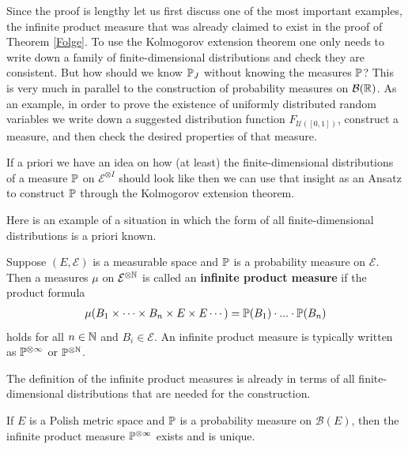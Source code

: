 Since the proof is lengthy let us first discuss one of the most important examples, the infinite product measure that was already claimed to exist in the proof of Theorem \ref{Folge}. To use the Kolmogorov extension theorem one only needs to write down a family of finite-dimensional distributions and check they are consistent. But how should we know $\P_J$ without knowing the measures $\P$? This is very much in parallel to the construction of probability measures on $\mathcal B(\R)$. As an example, in order to prove the existence of uniformly distributed random variables we write down a suggested distribution function $F_{\mathcal U([0,1])}$, construct a measure, and then check the desired properties of that measure.
\begin{laufmerksamkeit}
	If a priori we have an idea on how (at least) the finite-dimensional distributions of a measure $\P$ on $\mathcal E^{\otimes I}$ should look like then we can use that insight as an Ansatz to construct $\P$ through the Kolmogorov extension theorem.
\end{laufmerksamkeit}
Here is an example of a situation in which the form of all finite-dimensional distributions is a priori known.
\begin{ldef}
	\begin{deff}
		Suppose $(E, \mathcal E)$ is a measurable space and $\P$ is a probability measure on $\mathcal E$. Then a measures $\mu$ on $\mathcal E^{\otimes \N}$ is called an \textbf{infinite product measure} if the product formula
		\begin{align}\label{produkt}
			\mu(B_1\times\cdots \times B_n\times E\times E\cdots)=\P(B_1)\cdot ... \cdot \P(B_n)
		\end{align}
		holds for all $n\in\N$ and $B_i\in \mathcal E$. An infinite product measure is typically written as $\P^{\otimes \infty}$ or $\P^{\otimes \N}$.
	\end{deff}
\end{ldef}
The definition of the infinite product measures is already in  terms of all finite-dimensional distributions that are needed for the construction.
\begin{lsuperwichtigersatzExistence}
	\begin{theorem}
		If $E$ is a Polish metric space and $\P$ is a probability measure on $\mathcal B(E)$, then the infinite product measure $\P^{\otimes \infty}$ exists and is unique.
	\end{theorem}
\end{lsuperwichtigersatzExistence}
